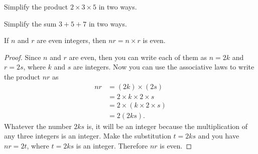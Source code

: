 \documentclass[a4paper,oneside,12pt]{article}
\begin{document}
\begin{exercise}
Simplify the product $2 \times 3 \times 5$ in two ways.
\end{exercise}


\begin{exercise}
Simplify the sum $3 + 5 + 7$ in two ways.
\end{exercise}


\begin{theorem}
\label{thm:product_of_two_evens_is_even}
If $n$ and $r$ are even integers, then $nr = n \times r$ is even.
\end{theorem}

\begin{proof}
Since $n$ and $r$ are even, then you can write each of them as
$n = 2k$ and $r = 2s$, where $k$ and $s$ are integers.  Now you can
use the associative laws to write the product $nr$ as
\begin{align*}
nr
&=
(2k) \times (2s) \\[4pt]
&=
2 \times k \times 2 \times s \\[4pt]
&=
2 \times (k \times 2 \times s) \\[4pt]
&=
2 (2ks).
\end{align*}
Whatever the number $2ks$ is, it will be an integer because the
multiplication of any three integers is an integer.  Make the
substitution $t = 2ks$ and you have $nr = 2t$, where $t = 2ks$ is an
integer.  Therefore $nr$ is even.
\end{proof}
\end{document}
